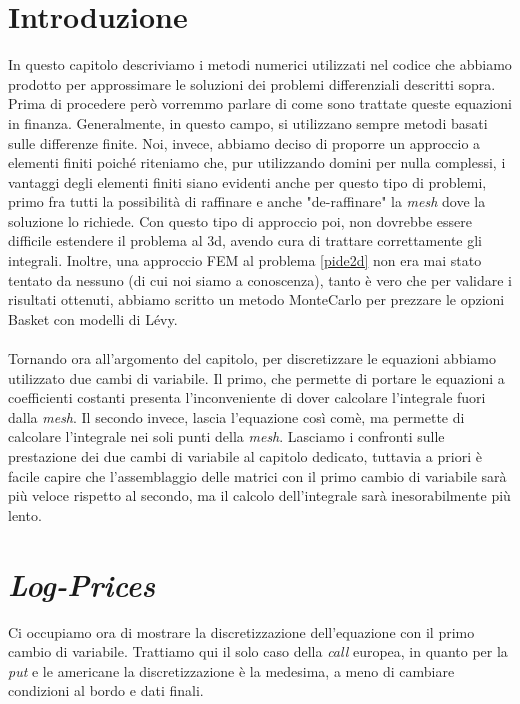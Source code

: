 \documentclass[a4paper,10pt]{report}
\theoremstyle{osservazione}
\theoremstyle{esempio}
\theoremstyle{notazione}
\theoremstyle{corollario}
\begin{document}
\section{Introduzione}
In questo capitolo descriviamo i metodi numerici utilizzati nel codice che abbiamo prodotto per approssimare le soluzioni dei problemi differenziali descritti sopra. Prima di procedere per\`o vorremmo parlare di come sono trattate queste equazioni in finanza. Generalmente, in questo campo, si utilizzano sempre metodi basati sulle differenze finite. Noi, invece, abbiamo deciso di proporre un approccio a elementi finiti poich\'e riteniamo che, pur utilizzando domini per nulla complessi, i vantaggi degli elementi finiti siano evidenti anche per questo tipo di problemi, primo fra tutti la possibilit\`a di raffinare e anche "de-raffinare" la \emph{mesh} dove la soluzione lo richiede. Con questo tipo di approccio poi, non dovrebbe essere difficile estendere il problema al 3d, avendo cura di trattare correttamente gli integrali. Inoltre, una approccio FEM al problema \ref{pide2d} non era mai stato tentato da nessuno (di cui noi siamo a conoscenza), tanto \`e vero che per validare i risultati ottenuti, abbiamo scritto un metodo MonteCarlo per prezzare le opzioni Basket con modelli di L\'evy.\\\\Tornando ora all'argomento del capitolo, per discretizzare le equazioni abbiamo utilizzato due cambi di variabile. Il primo, che permette di portare le equazioni a coefficienti costanti presenta l'inconveniente di dover calcolare l'integrale fuori dalla \emph{mesh}. Il secondo invece, lascia l'equazione cos\`i com\`e, ma permette di calcolare l'integrale nei soli punti della \emph{mesh}. Lasciamo i confronti sulle prestazione dei due cambi di variabile al capitolo dedicato, tuttavia a priori \`e facile capire che l'assemblaggio delle matrici con il primo cambio di variabile sar\`a pi\`u veloce rispetto al secondo, ma il calcolo dell'integrale sar\`a inesorabilmente pi\`u lento.

\section{\emph{Log-Prices}}
Ci occupiamo ora di mostrare la discretizzazione dell'equazione con il primo cambio di variabile. Trattiamo qui il solo caso della \emph{call} europea, in quanto per la \emph{put} e le americane la discretizzazione \`e la medesima, a meno di cambiare condizioni al bordo e dati finali.
\end{document}
